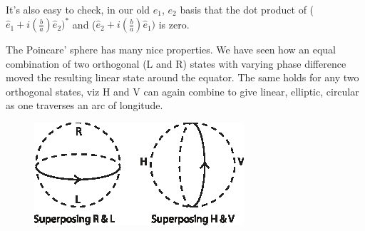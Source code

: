 It's also easy to check, in our old $e_1$, $e_2$ basis that the dot product of ($\hat{e}_1 + i (\frac{b}{a}) \hat{e}_2)^{\ast}$ and ($\hat{e}_2 + i(\frac{b}{a}) \hat{e}_1)$ is zero.

\medskip

The Poincare' sphere has many nice properties. We have seen how an equal
combination of two orthogonal (L and R) states with varying phase difference
moved the resulting linear state around the equator. The same holds for any
two orthogonal states, viz H and V can again combine to give linear, elliptic,
circular as one traverses an arc of longitude.
\begin{figure}[H]
\centering
\includegraphics[scale=1]{src/images/chap26/9.jpg}
\end{figure}

